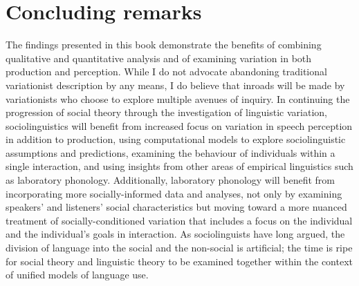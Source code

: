 \section{Concluding remarks}


The findings presented in this book demonstrate the benefits of combining qualitative and quantitative analysis and of examining variation in both production and perception.  While I do not advocate abandoning traditional variationist description by any means, I do believe that inroads will be made by variationists who choose to explore multiple avenues of inquiry.  In continuing the progression of social theory through the investigation of linguistic variation, sociolinguistics will benefit from increased focus on variation in speech perception in addition to production, using computational models to explore sociolinguistic assumptions and predictions, examining the behaviour of individuals within a single interaction, and using insights from other areas of empirical linguistics such as laboratory phonology.  Additionally, laboratory phonology will benefit from incorporating more socially-informed data and analyses, not only by examining speakers' and listeners' social characteristics but moving toward a more nuanced treatment of socially-conditioned variation that includes a focus on the individual and the individual's goals in interaction. As sociolinguists have long argued, the division of language into the social and the non-social is artificial; the time is ripe for social theory and linguistic theory to be examined together within the context of unified models of language use.
